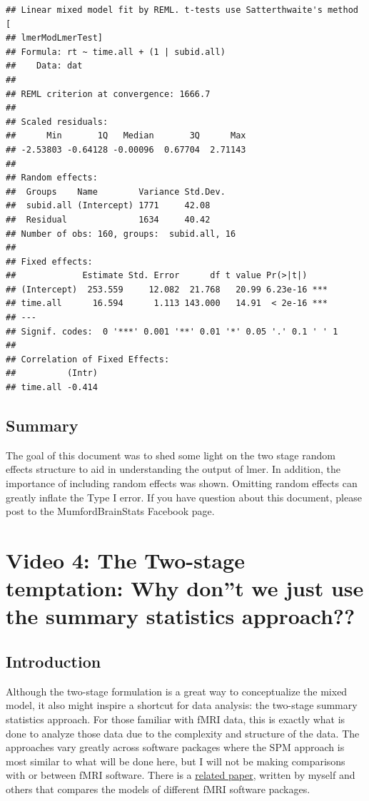 \documentclass[]{book}
\begin{document}
\begin{verbatim}
## Linear mixed model fit by REML. t-tests use Satterthwaite's method [
## lmerModLmerTest]
## Formula: rt ~ time.all + (1 | subid.all)
##    Data: dat
## 
## REML criterion at convergence: 1666.7
## 
## Scaled residuals: 
##      Min       1Q   Median       3Q      Max 
## -2.53803 -0.64128 -0.00096  0.67704  2.71143 
## 
## Random effects:
##  Groups    Name        Variance Std.Dev.
##  subid.all (Intercept) 1771     42.08   
##  Residual              1634     40.42   
## Number of obs: 160, groups:  subid.all, 16
## 
## Fixed effects:
##             Estimate Std. Error      df t value Pr(>|t|)    
## (Intercept)  253.559     12.082  21.768   20.99 6.23e-16 ***
## time.all      16.594      1.113 143.000   14.91  < 2e-16 ***
## ---
## Signif. codes:  0 '***' 0.001 '**' 0.01 '*' 0.05 '.' 0.1 ' ' 1
## 
## Correlation of Fixed Effects:
##          (Intr)
## time.all -0.414
\end{verbatim}

\section{Summary}\label{summary}

The goal of this document was to shed some light on the two stage random
effects structure to aid in understanding the output of lmer. In
addition, the importance of including random effects was shown. Omitting
random effects can greatly inflate the Type I error. If you have
question about this document, please post to the MumfordBrainStats
Facebook page.

\chapter{Video 4: The Two-stage temptation: Why don''t we just use the
summary statistics
approach??}\label{video-4-the-two-stage-temptation-why-dont-we-just-use-the-summary-statistics-approach}

\section{Introduction}\label{introduction-2}

Although the two-stage formulation is a great way to conceptualize the
mixed model, it also might inspire a shortcut for data analysis: the
two-stage summary statistics approach. For those familiar with fMRI
data, this is exactly what is done to analyze those data due to the
complexity and structure of the data. The approaches vary greatly across
software packages where the SPM approach is most similar to what will be
done here, but I will not be making comparisons with or between fMRI
software. There is a
\href{https://www.ncbi.nlm.nih.gov/pubmed/19463958}{related paper},
written by myself and others that compares the models of different fMRI
software packages.
\end{document}
